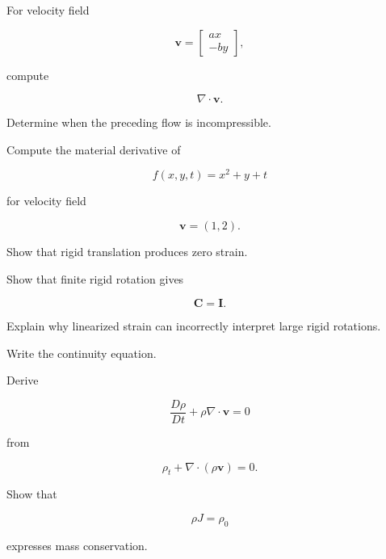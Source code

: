 \begin{exercise}[2]
For velocity field

\[
\mathbf{v}
=
\begin{bmatrix}
ax\\
-by
\end{bmatrix},
\]

compute

\[
\nabla\cdot\mathbf{v}.
\]
\end{exercise}

\begin{exercise}[3]
Determine when the preceding flow is incompressible.
\end{exercise}

\begin{exercise}[2]
Compute the material derivative of

\[
f(x,y,t)=x^2+y+t
\]

for velocity field

\[
\mathbf{v}=(1,2).
\]
\end{exercise}

\begin{exercise}[2]
Show that rigid translation produces zero strain.
\end{exercise}

\begin{exercise}[3]
Show that finite rigid rotation gives

\[
\mathbf{C}=\mathbf{I}.
\]
\end{exercise}

\begin{exercise}[3]
Explain why linearized strain can incorrectly interpret large rigid
rotations.
\end{exercise}

\begin{exercise}[2]
Write the continuity equation.
\end{exercise}

\begin{exercise}[3]
Derive

\[
\frac{D\rho}{Dt}
+
\rho\nabla\cdot\mathbf{v}
=
0
\]

from

\[
\rho_t+\nabla\cdot(\rho\mathbf{v})=0.
\]
\end{exercise}

\begin{exercise}[3]
Show that

\[
\rho J=\rho_0
\]

expresses mass conservation.
\end{exercise}

